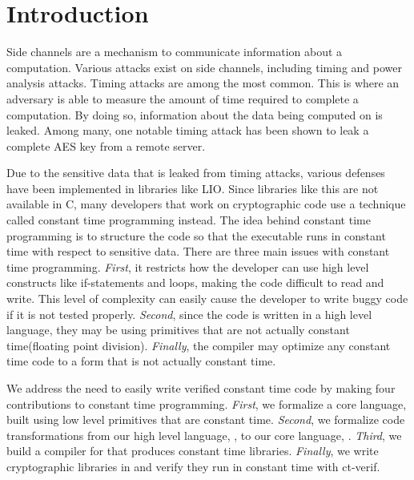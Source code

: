 \section{Introduction}
Side channels are a mechanism to communicate information about a computation.
Various attacks exist on side channels, including timing and power analysis
attacks. Timing attacks are among the most common. This is where an adversary is
able to measure the amount of time required to complete a computation. By doing
so, information about the data being computed on is leaked. Among many, one
notable timing attack has been shown to leak a complete AES key from a remote
server\cite{brumley2005remote}.

Due to the sensitive data that is leaked from timing attacks, various defenses
have been implemented in libraries like LIO\cite{stefan2012}. Since libraries
like this are not available in C, many developers that work on cryptographic
code use a technique called constant time programming instead. The idea behind
constant time programming is to structure the code so that the executable runs
in constant time with respect to sensitive data. There are three main issues
with constant time programming. \textit{First}, it restricts how the developer
can use high level constructs like if-statements and loops, making the code
difficult to read and write. This level of complexity can easily cause the
developer to write buggy code if it is not tested properly. \textit{Second},
since the code is written in a high level language, they may be using primitives
that are not actually constant time(\eg floating point division).
\textit{Finally}, the compiler may optimize any constant time code to a form
that is not actually constant time.

We address the need to easily write verified constant time code by making four
contributions to constant time programming. \textit{First}, we formalize a core
language, built using low level primitives that are constant time.
\textit{Second}, we formalize code transformations from our high level language,
\constc, to our core language, \ccore. \textit{Third}, we build a compiler for
\constc that produces constant time libraries. \textit{Finally}, we write
cryptographic libraries in \constc and verify they run in constant time with
ct-verif\cite{almeida2016}.



